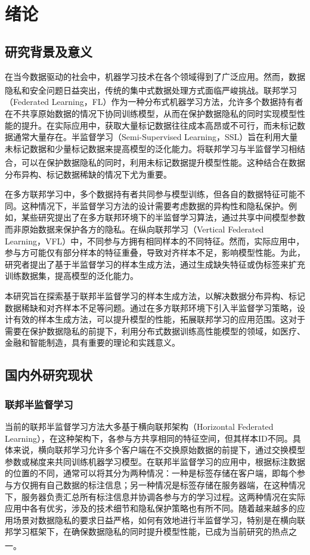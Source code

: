 \chapter{绪论} 
\thispagestyle{others} 
\pagestyle{others} 
\xiaosi 

\section{研究背景及意义}
在当今数据驱动的社会中，机器学习技术在各个领域得到了广泛应用。然而，数据隐私和安全问题日益突出，传统的集中式数据处理方式面临严峻挑战\textsuperscript{\cite{chen2021secureboost+,de2010practical}}。联邦学习（Federated Learning，FL）作为一种分布式机器学习方法，允许多个数据持有者在不共享原始数据的情况下协同训练模型，从而在保护数据隐私的同时实现模型性能的提升。在实际应用中，获取大量标记数据往往成本高昂或不可行，而未标记数据通常大量存在。半监督学习（Semi-Supervised Learning，SSL）旨在利用大量未标记数据和少量标记数据来提高模型的泛化能力。将联邦学习与半监督学习相结合，可以在保护数据隐私的同时，利用未标记数据提升模型性能\textsuperscript{\cite{li2021comatch}}。这种结合在数据分布异构、标记数据稀缺的情况下尤为重要。

在多方联邦学习中，多个数据持有者共同参与模型训练，但各自的数据特征可能不同。这种情况下，半监督学习方法的设计需要考虑数据的异构性和隐私保护。例如，某些研究提出了在多方联邦环境下的半监督学习算法，通过共享中间模型参数而非原始数据来保护各方的隐私。在纵向联邦学习（Vertical Federated Learning，VFL）中，不同参与方拥有相同样本的不同特征。然而，实际应用中，参与方可能仅有部分样本的特征重叠，导致对齐样本不足，影响模型性能。为此，研究者提出了基于半监督学习的样本生成方法，通过生成缺失特征或伪标签来扩充训练数据集，提高模型的泛化能力。

本研究旨在探索基于联邦半监督学习的样本生成方法，以解决数据分布异构、标记数据稀缺和对齐样本不足等问题。通过在多方联邦环境下引入半监督学习策略，设计有效的样本生成方法，可以提升模型的性能，拓展联邦学习的应用范围。这对于需要在保护数据隐私的前提下，利用分布式数据训练高性能模型的领域，如医疗、金融和智能制造，具有重要的理论和实践意义。

\section{国内外研究现状}
\subsection{联邦半监督学习}
当前的联邦半监督学习方法大多基于横向联邦架构（Horizontal Federated Learning），在这种架构下，各参与方共享相同的特征空间，但其样本ID不同。具体来说，横向联邦学习允许多个客户端在不交换原始数据的前提下，通过交换模型参数或梯度来共同训练机器学习模型。在联邦半监督学习的应用中，根据标注数据的位置的不同，通常可以将其分为两种情况：一种是标签存储在客户端，即每个参与方仅拥有自己数据的标注信息；另一种情况是标签存储在服务器端，在这种情况下，服务器负责汇总所有标注信息并协调各参与方的学习过程。这两种情况在实际应用中各有优劣，涉及的技术细节和隐私保护策略也有所不同。随着越来越多的应用场景对数据隐私的要求日益严格，如何有效地进行半监督学习，特别是在横向联邦学习框架下，在确保数据隐私的同时提升模型性能，已成为当前研究的热点之一\textsuperscript{\cite{jin2023federated}}。

